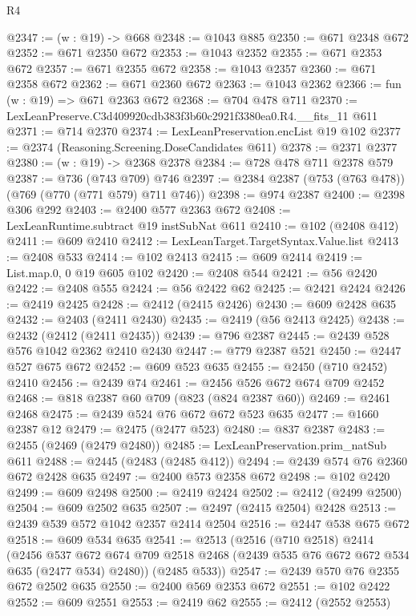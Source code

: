 \begin{lexlean}{R4}
\begin{coremodule}
@2347 := (w : @19) -> @668
@2348 := @1043 @885
@2350 := @671 @2348 @672
@2352 := @671 @2350 @672
@2353 := @1043 @2352
@2355 := @671 @2353 @672
@2357 := @671 @2355 @672
@2358 := @1043 @2357
@2360 := @671 @2358 @672
@2362 := @671 @2360 @672
@2363 := @1043 @2362
@2366 := fun (w : @19) => @671 @2363 @672
@2368 := @704 @478 @711
@2370 := LexLeanPreserve.C3d409920cdb383f3b60c2921f3380ea0.R4.__fits_11 @611
@2371 := @714 @2370
@2374 := LexLeanPreservation.encList @19 @102
@2377 := @2374 (Reasoning.Screening.DoseCandidates @611)
@2378 := @2371 @2377
@2380 := (w : @19) -> @2368 @2378
@2384 := @728 @478 @711 @2378 @579
@2387 := @736 (@743 @709) @746
@2397 := @2384 @2387 (@753 (@763 @478)) (@769 (@770 (@771 @579) @711 @746))
@2398 := @974 @2387
@2400 := @2398 @306 @292
@2403 := @2400 @577 @2363 @672
@2408 := LexLeanRuntime.subtract @19 instSubNat @611
@2410 := @102 (@2408 @412)
@2411 := @609 @2410
@2412 := LexLeanTarget.TargetSyntax.Value.list
@2413 := @2408 @533
@2414 := @102 @2413
@2415 := @609 @2414
@2419 := List.map.{0, 0} @19 @605 @102
@2420 := @2408 @544
@2421 := @56 @2420
@2422 := @2408 @555
@2424 := @56 @2422 @62
@2425 := @2421 @2424
@2426 := @2419 @2425
@2428 := @2412 (@2415 @2426)
@2430 := @609 @2428 @635
@2432 := @2403 (@2411 @2430)
@2435 := @2419 (@56 @2413 @2425)
@2438 := @2432 (@2412 (@2411 @2435))
@2439 := @796 @2387
@2445 := @2439 @528 @576 @1042 @2362 @2410 @2430
@2447 := @779 @2387 @521
@2450 := @2447 @527 @675 @672
@2452 := @609 @523 @635
@2455 := @2450 (@710 @2452) @2410
@2456 := @2439 @74
@2461 := @2456 @526 @672 @674 @709 @2452
@2468 := @818 @2387 @60 @709 (@823 (@824 @2387 @60))
@2469 := @2461 @2468
@2475 := @2439 @524 @76 @672 @672 @523 @635
@2477 := @1660 @2387 @12
@2479 := @2475 (@2477 @523)
@2480 := @837 @2387
@2483 := @2455 (@2469 (@2479 @2480))
@2485 := LexLeanPreservation.prim_natSub @611
@2488 := @2445 (@2483 (@2485 @412))
@2494 := @2439 @574 @76 @2360 @672 @2428 @635
@2497 := @2400 @573 @2358 @672
@2498 := @102 @2420
@2499 := @609 @2498
@2500 := @2419 @2424
@2502 := @2412 (@2499 @2500)
@2504 := @609 @2502 @635
@2507 := @2497 (@2415 @2504) @2428
@2513 := @2439 @539 @572 @1042 @2357 @2414 @2504
@2516 := @2447 @538 @675 @672
@2518 := @609 @534 @635
@2541 := @2513
    (@2516
      (@710 @2518)
      @2414
      (@2456
        @537
        @672
        @674
        @709
        @2518
        @2468
        (@2439 @535 @76 @672 @672 @534 @635 (@2477 @534) @2480))
      (@2485 @533))
@2547 := @2439 @570 @76 @2355 @672 @2502 @635
@2550 := @2400 @569 @2353 @672
@2551 := @102 @2422
@2552 := @609 @2551
@2553 := @2419 @62
@2555 := @2412 (@2552 @2553)

\end{coremodule}
\end{lexlean}
